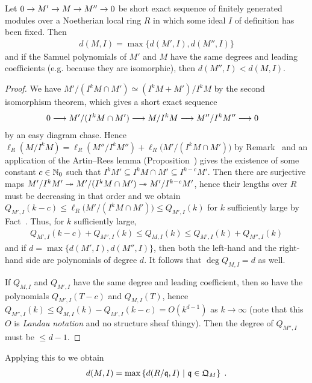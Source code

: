 \documentclass[a4paper,parskip=half,numbers=enddot, DIV=12]{scrreprt}
\begin{document}
\begin{cor}
    Let $0\morphism M'\morphism M \morphism M''\morphism 0$ be short exact sequence of finitely generated modules over a Noetherian local ring $R$ in which some ideal $I$ of definition has been fixed. Then 
    \begin{align*}
    	d(M,I) = \max\{d(M',I), d(M'',I)\}
    \end{align*}
    and if the Samuel polynomials of $M'$ and $M$ have the same degrees and leading coefficients (e.g. because they are isomorphic), then $d(M'',I) < d(M,I)$.
\end{cor}
\begin{proof}
    We have $M'/(I^kM\cap M')\simeq (I^kM+M')/I^kM$ by the second isomorphism theorem, which gives a short exact sequence
    \begin{align*}
        0 &\morphism M'/(I^kM\cap M') \morphism M/I^kM \morphism M''/I^kM'' \morphism 0
    \end{align*}
    by an easy diagram chase. Hence $\ell_R(M/I^kM) = \ell_R(M''/I^kM'') + \ell_R\big(M'/(I^kM\cap M')\big)$ by Remark~ and an application of the Artin--Rees lemma (Proposition~) gives the existence of some constant $c\in \mathbb{N}_0$ such that $I^kM'\subseteq I^kM\cap M'\subseteq I^{k-c}M'$. Then there are surjective maps $M'/I^kM'\epimorphism M'/(I^kM\cap M')\epimorphism M'/I^{k-c}M'$, hence their lengths over $R$ must be decreasing in that order and we obtain $Q_{M',I}(k-c) \leq \ell_R\big(M'/(I^kM\cap M')\big) \leq Q_{M',I}(k)$ for $k$ sufficiently large by Fact~. Thus, for $k$ sufficiently large,
    \begin{align*}
        Q_{M',I}(k-c) + Q_{M'',I}(k) \leq Q_{M,I}(k) \leq Q_{M',I}(k) + Q_{M'',I}(k)
    \end{align*}
    and if $d=\max\{d(M',I), d(M'',I)\}$, then both the left-hand and the right-hand side are polynomials of degree $d$. It follows that $\deg Q_{M,I}=d$ as well.
    
     If $Q_{M,I}$ and $Q_{M',I}$ have the same degree and leading coefficient, then so have the polynomials $Q_{M',I}(T-c)$ and $Q_{M,I}(T)$, hence $Q_{M'',I}(k)\leq Q_{M,I}(k)-Q_{M',I}(k-c)=O(k^{d-1})$ as $k\to\infty$ (note that this $O$ is \emph{Landau notation} and no structure sheaf thingy).
     Then the degree of $Q_{M'',I}$ must be $\leq d-1$.
\end{proof}
\begin{cor}
    Applying this to  we obtain 
    \begin{align*}
        d(M,I) = \max\left\{d(R/\mathfrak{q},I) \ \middle|\  \mathfrak{q}\in \mathfrak{Q}_M\right\}\;.
    \end{align*}
\end{cor}
\end{document}
